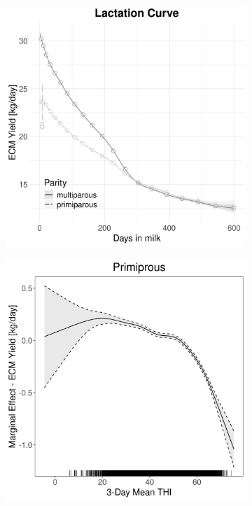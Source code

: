 \begin{figure}[H]
\begin{subfigure}[b]{0.45\textwidth}
        \includegraphics[width=\textwidth]{thesis/figures/models/ecm/before2010/si_ecm_before2010/si_ecm_before2010_marginal_dim_milk_combined.png}
    \end{subfigure}
    \begin{subfigure}[b]{0.45\textwidth}
        \centering
        \includegraphics[width=\textwidth]{thesis/figures/models/ecm/before2010/si_ecm_before2010/si_ecm_before2010_marginal_thi_milk_primi.png}

\end{subfigure}
\end{figure}
